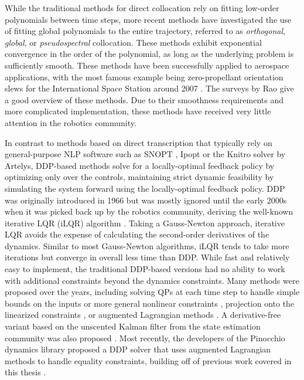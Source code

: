 \documentclass[../root.tex]{subfiles}
\begin{document}
While the traditional methods for direct collocation rely on fitting
low-order polynomials between time steps, more recent methods have
investigated the use of fitting global polynomials to the entire trajectory,
referred to as \textit{orthogonal}, \textit{global}, or
\textit{pseudospectral} collocation. These methods exhibit exponential
convergence in the order of the polynomial, as long as the underlying problem
is sufficiently smooth. These methods have been successfully applied to
aerospace applications, with the most famous example being zero-propellant
orientation slews for the International Space Station around 2007
\cite{kang_Pseudospectral_2007}. The surveys by Rao
\cite{rao_Survey_,rao_Trajectory_2014} give a good overview of these methods.
Due to their smoothness requirements and more complicated implementation,
these methods have received very little attention in the robotics community.

In contrast to methods based on direct transcription that typically rely on
general-purpose NLP software such as SNOPT \cite{gill_SNOPT_2005}, Ipopt
\cite{wachter_Implementation_2006} or the Knitro solver by Artelys, DDP-based
methods solve for a locally-optimal feedback policy by optimizing only over
the controls, maintaining strict dynamic feasibility by simulating the system
forward using the locally-optimal feedback policy. DDP was originally
introduced in 1966 \cite{mayne_Secondorder_1966} but was mostly ignored until
the early 2000s when it was picked back up by the robotics community,
deriving the well-known iterative LQR (iLQR) algorithm
\cite{todorov_Generalized_2005}. Taking a Gauss-Newton approach, iterative
LQR avoids the expense of calculating the second-order derivatives of the
dynamics. Similar to most Gauss-Newton algorithms, iLQR tends to take more
iterations but converge in overall less time than DDP. While fast and
relatively easy to implement, the traditional DDP-based versions had no
ability to work with additional constraints beyond the dynamics constraints.
Many methods were proposed over the years, including solving QPs at each time
step to handle simple bounds on the inputs \cite{tassa_Controllimited_2014}
or more general nonlinear constraints \cite{xie_Differential_2017},
projection onto the linearized constraints \cite{giftthaler_Projection_2017},
or augmented Lagrangian methods \cite{plancher_Constrained_2017}. A
derivative-free variant based on the unscented Kalman filter from the state
estimation community was also proposed \cite{manchester_Derivativefree_2016}.
Most recently, the developers of the Pinocchio dynamics library
\cite{carpentier_Pinocchio_2019} proposed a DDP solver that uses augmented Lagrangian
methods to handle equality constraints, building off of previous work covered
in this thesis \cite{kazdadi_Equality_2021}.
\end{document}
